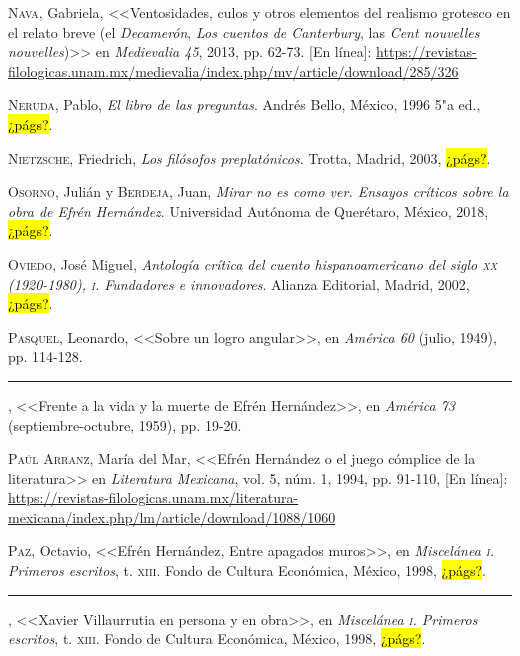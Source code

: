 \documentclass[14pt,twoside,final]{extbook} %
\begin{document}
\textsc{Nava}, Gabriela, <<Ventosidades, culos y otros elementos del realismo grotesco en el relato breve (el \emph{Decamerón}, \emph{Los cuentos de Canterbury}, las \emph{Cent nouvelles nouvelles})>> en \emph{Medievalia 45}, 2013, pp. 62-73. [En línea]: \url{https://revistas-filologicas.unam.mx/medievalia/index.php/mv/article/download/285/326}\label{bib:nava2013}

\textsc{Neruda}, Pablo, \emph{El libro de las preguntas}. Andrés Bello, México, 1996 5"a ed., \hl{¿págs?}.\label{bib:neruda1996}

\textsc{Nietzsche}, Friedrich, \emph{Los filósofos preplatónicos}. Trotta, Madrid, 2003, \hl{¿págs?}.\label{bib:nietzche2003}

\textsc{Osorno}, Julián y \textsc{Berdeja}, Juan, \emph{Mirar no es como ver. Ensayos críticos sobre la obra de Efrén Hernández}. Universidad Autónoma de Querétaro, México, 2018, \hl{¿págs?}.\label{bib:osorno2018}

\textsc{Oviedo}, José Miguel, \emph{Antología crítica del cuento hispanoamericano del siglo \textsc{xx} (1920-1980), \textsc{i}. Fundadores e innovadores}. Alianza Editorial, Madrid, 2002, \hl{¿págs?}.\label{bib:oviedo2002}

\textsc{Pasquel}, Leonardo, <<Sobre un logro angular>>, en \emph{América 60} (julio, 1949), pp. 114-128.\label{bib:pasquel1949}

\rule{1cm}{0.4pt}, <<Frente a la vida y la muerte de Efrén Hernández>>, en \emph{América 73} (septiembre-octubre, 1959), pp. 19-20.\label{bib:pasquel1959}

\textsc{Paúl Arranz}, María del Mar, <<Efrén Hernández o el juego cómplice de la literatura>> en \emph{Literatura Mexicana}, vol. 5, núm. 1, 1994, pp. 91-110, [En línea]: \url{https://revistas-filologicas.unam.mx/literatura-mexicana/index.php/lm/article/download/1088/1060}\label{bib:paul1994}

\textsc{Paz}, Octavio, <<Efrén Hernández, Entre apagados muros>>, en \emph{Miscelánea \textsc{i}. Primeros escritos}, t. \textsc{xiii}. Fondo de Cultura Económica, México, 1998, \hl{¿págs?}.\label{bib:paz1998a}

\rule{1cm}{0.4pt}, <<Xavier Villaurrutia en persona y en obra>>, en \emph{Miscelánea \textsc{i}. Primeros escritos}, t. \textsc{xiii}. Fondo de Cultura Económica, México, 1998, \hl{¿págs?}.\label{bib:paz1998b}
\end{document}
